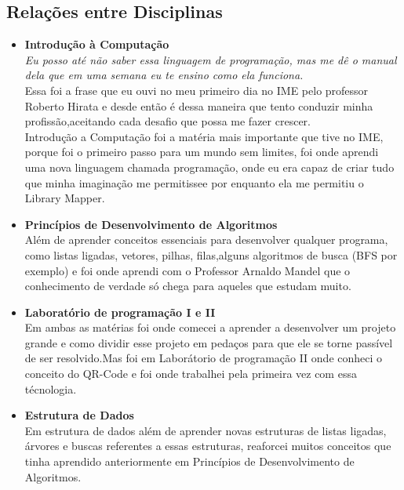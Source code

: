\documentclass[a4paper,10pt]{article}
\begin{document}
  \subsection{Relações entre Disciplinas}
\begin{itemize}	
	\item{\bf{Introdução à Computação}}\\

	{\it Eu posso até não saber essa linguagem de programação, mas me dê o manual dela que em uma semana eu te ensino como ela funciona.}\\
	
	Essa foi a frase que eu ouvi no meu primeiro dia no IME pelo professor Roberto Hirata e desde então é dessa maneira que
	tento conduzir minha profissão,aceitando cada desafio que possa me fazer crescer.\\

	Introdução a Computação foi a matéria mais importante que tive no IME, porque foi o primeiro passo para um mundo sem limites, foi onde
	aprendi uma nova linguagem chamada programação, onde eu era capaz de criar tudo que minha imaginação me permitissee por enquanto
	ela me permitiu o Library Mapper.	

	
	\item{\bf{Princípios de Desenvolvimento de Algoritmos}}\\

	Além de aprender conceitos essenciais para desenvolver qualquer programa, como listas ligadas, vetores, pilhas, filas,alguns algoritmos
	de busca (BFS por exemplo) e foi
	onde aprendi com o Professor Arnaldo Mandel que o conhecimento de verdade só chega para aqueles que estudam muito.
	
	
	\item{\bf{Laboratório de programação I e II}}\\

	Em ambas as matérias foi onde comecei a aprender a desenvolver um projeto grande e como dividir esse projeto em pedaços para
	que ele se torne passível de ser resolvido.Mas foi em Laborátorio de programação II onde conheci o conceito do QR-Code e foi onde trabalhei 
	pela primeira vez com essa técnologia.

	\item{\bf{Estrutura de Dados}}\\
		Em estrutura de dados além de aprender novas estruturas de listas ligadas, árvores e buscas referentes a essas estruturas,
	reaforcei muitos conceitos que tinha aprendido anteriormente em Princípios de Desenvolvimento de Algoritmos.
			

\end{itemize}
\end{document}
